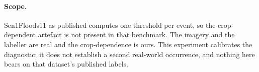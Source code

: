 \paragraph{Scope.} Sen1Floods11 as published computes one threshold per event, so the
crop-dependent artefact is not present in that benchmark. The imagery and the labeller
are real and the crop-dependence is ours. This experiment calibrates the diagnostic;
it does not establish a second real-world occurrence, and nothing here bears on that
dataset's published labels.
